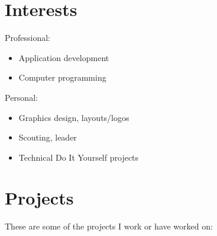 \documentclass[]{friggeri-cv}
\providecommand{\tightlist}{%
\setlength{\itemsep}{0pt}\setlength{\parskip}{0pt}}
\begin{document}

\section{Interests}

Professional:
\begin{multicols}{2}
\begin{itemize}
  \tightlist{}
  \item Application development
  \item Computer programming
\end{itemize}
\end{multicols}


Personal:
\begin{multicols}{2}
\begin{itemize}
  \tightlist{}
  \item Graphics design, layouts/logos
  \item Scouting, leader
  \item Technical Do It Yourself projects
\end{itemize}
\end{multicols}

\newpage{}


\section{Projects}

These are some of the projects I work or have worked on:
\end{document}
